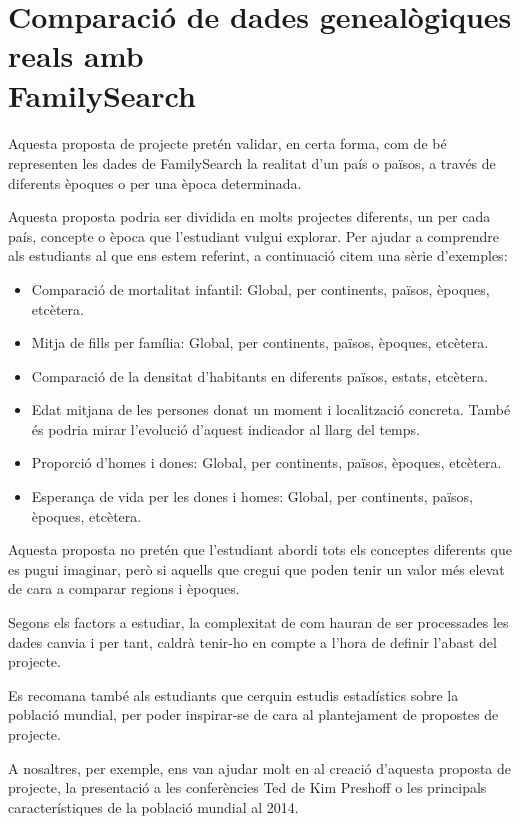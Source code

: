 \section{Comparació de dades genealògiques reals amb\\Family\-Search}

    \paragraph{}
    Aquesta proposta de projecte pretén validar, en certa forma, com de bé representen les dades de FamilySearch la realitat d'un país o països, a través de diferents èpoques o per una època determinada.

    Aquesta proposta podria ser dividida en molts projectes diferents, un per cada país, concepte o època que l'estudiant vulgui explorar. Per ajudar a comprendre als estudiants al que ens estem referint, a continuació citem una sèrie d'exemples:

    \begin{itemize}
        \item Comparació de mortalitat infantil: Global, per continents, països, èpoques, etcètera.
        \item Mitja de fills per família: Global, per continents, països, èpoques, etcètera.
        \item Comparació de la densitat d'habitants en diferents països, estats, etcètera.
        \item Edat mitjana de les persones donat un moment i localització concreta. Tam\-bé és podria mirar l'evolució d'aquest indicador al llarg del temps.
        \item Proporció d'homes i dones: Global, per continents, països, èpoques, etcètera.
        \item Esperança de vida per les dones i homes: Global, per continents, països, èpoques, etcètera.
    \end{itemize}

    Aquesta proposta no pretén que l'estudiant abordi tots els conceptes diferents que es pugui imaginar, però si aquells que cregui que poden tenir un valor més elevat de cara a comparar regions i èpoques.

    Segons els factors a estudiar, la complexitat de com hauran de ser processades les dades canvia i per tant, caldrà tenir-ho en compte a l'hora de definir l'abast del projecte.

    Es recomana també als estudiants que cerquin estudis estadístics sobre la població mundial, per poder inspirar-se de cara al plantejament de propostes de projecte.

    A nosaltres, per exemple, ens van ajudar molt en al creació d'aquesta proposta de projecte, la presentació a les conferències Ted de Kim Preshoff o les principals característiques de la població mundial al 2014.
